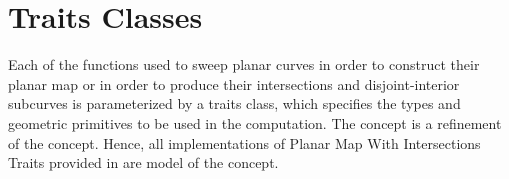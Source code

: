 
\section{Traits Classes}
Each of the functions used to sweep planar curves in order to construct 
their planar map or in order to produce their intersections and 
disjoint-interior subcurves 
is parameterized by a traits class, which specifies the types and geometric
primitives to be used in the computation.
The  concept is a refinement of the 
  concept. 
Hence, all implementations of Planar Map With Intersections Traits 
provided in \cgal are model of the  concept. 


%
